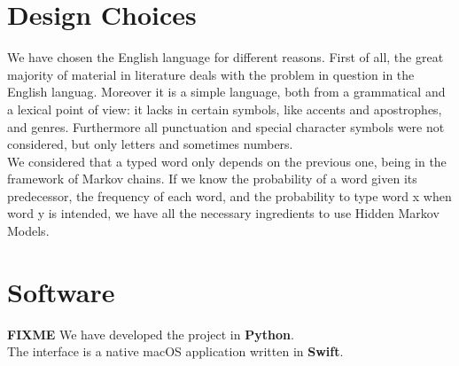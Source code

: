 \section{Design Choices}

We have chosen the English language for different reasons. First of all, the great majority of material in literature deals 
with the problem in question in the English languag. Moreover it is a simple language, both from a grammatical and a 
lexical point of view: it lacks in certain symbols, like accents and apostrophes, and genres. 
Furthermore all punctuation and special character symbols were not considered, but only letters and sometimes numbers. 
\\

We considered that a typed word only depends on the previous one, being 
in the framework of Markov chains. If we know the probability of a word 
given its predecessor, the frequency of each word, and the probability to 
type word x when word y is intended, we have all the necessary ingredients 
to use Hidden Markov Models.

\section{Software}
\textbf{FIXME}
We have developed the project in \textbf{Python}.\\
The interface is a native macOS application written in \textbf{Swift}.
